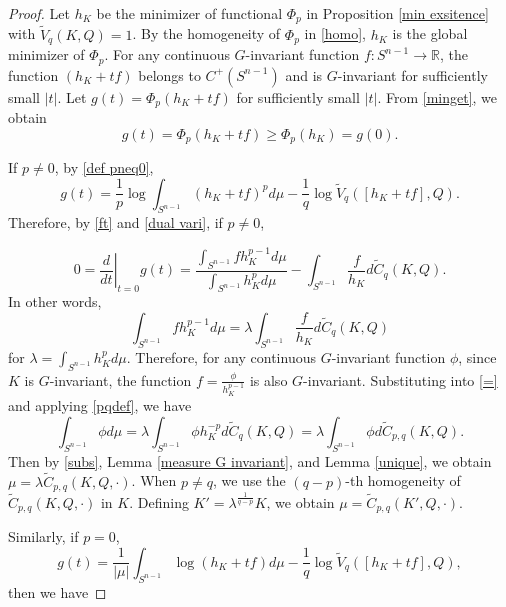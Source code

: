 \documentclass[12pt, reqno]{amsart}
\theoremstyle{definition}
\theoremstyle{remark}
\numberwithin{equation}{section}
\newcommand{\Sn}{S^{n-1}}
\begin{document}
\begin{proof}
	Let $h_{K}$ be the minimizer of functional $\Phi_{p}$ in Proposition \ref{min exsitence} with $\widetilde{V}_{q}(K,Q)=1$.
By the homogeneity of $\Phi_{p}$ in \eqref{homo}, $h_K$ is the global minimizer of $\Phi_{p}$.	For any continuous $G$-invariant function $f:\Sn\rightarrow \mathbb{R}$,   the function $\left( h_{K}+tf\right) $ belongs to $C^{+}(\Sn)$ and is $G$-invariant for sufficiently small $|t|$.  Let $g(t)=\Phi_{p}(h_{K}+tf)$ for sufficiently small $|t|$.
	From \eqref{minget}, we obtain
	\begin{equation}\label{ft}
		g(t)=\Phi_{p}(h_{K}+tf)\ge \Phi_{p}(h_{K})=g(0).
	\end{equation}
	
	If $p\neq 0$, by \eqref{def pneq0},
	\begin{equation*}
		g(t) = \frac{1}{p} \log \int_{S^{n-1}} (h_{K}+tf)^{p}  d\mu - \frac{1}{q} \log \widetilde{V}_{q}([h_{K}+tf], Q).
	\end{equation*}
	Therefore, by \eqref{ft} and \eqref{dual vari}, if $p\neq 0$,  
	
	\begin{equation*}
			0=\left.\frac{d}{d t}\right|_{t=0}	g(t)=\dfrac{\int_{S^{n-1}}fh_{K}^{p-1}d\mu}{\int_{S^{n-1}}h_{K}^{p}d\mu}-\int_{S^{n-1}}\frac{f}{h_{K}}d\widetilde{C}_{q}(K,Q).
	\end{equation*}
	In other words,
	\begin{equation}\label{=}
		\int_{S^{n-1}}fh_{K}^{p-1}d\mu=\lambda \int_{S^{n-1}}\frac{f}{h_{K}}d\widetilde{C}_{q}(K,Q)
	\end{equation}
	for $\lambda=\int_{S^{n-1}}h_{K}^{p}d\mu$. Therefore, for any continuous $G$-invariant function $\phi$, since $K$ is $G$-invariant, the function $f=\frac{\phi}{h_{K}^{p-1}}$ is also $G$-invariant. Substituting into \eqref{=} and applying \eqref{pqdef}, we have
	\begin{equation}\label{subs}
		\int_{S^{n-1}}\phi d\mu=\lambda \int_{S^{n-1}}\phi h_{K}^{-p}d\widetilde{C}_{q}(K,Q)=\lambda\int_{S^{n-1}}\phi d\widetilde{C}_{p,q}(K,Q).
	\end{equation}
	Then by \eqref{subs}, Lemma \ref{measure G invariant}, and Lemma \ref{unique}, we obtain $\mu=\lambda \widetilde{C}_{p,q}(K,Q,\cdot)$.	
When $p\neq q$, we use the $(q-p)$-th homogeneity of $\widetilde{C}_{p,q}(K, Q, \cdot)$ in $K$. Defining $K' = \lambda^{\frac{1}{q-p}} K$, we obtain 
	$\mu= \widetilde{C}_{p,q}(K',Q,\cdot)$.	
	
	Similarly, if $p=0$, 
	\begin{equation*}
		g(t) = \frac{1}{|\mu|} \int _{S^{n-1}}\log (h_{K}+tf) d\mu - \frac{1}{q} \log \widetilde{V}_{q}([h_{K}+tf], Q),
	\end{equation*}
then	 we have
	

\end{proof}
\end{document}
